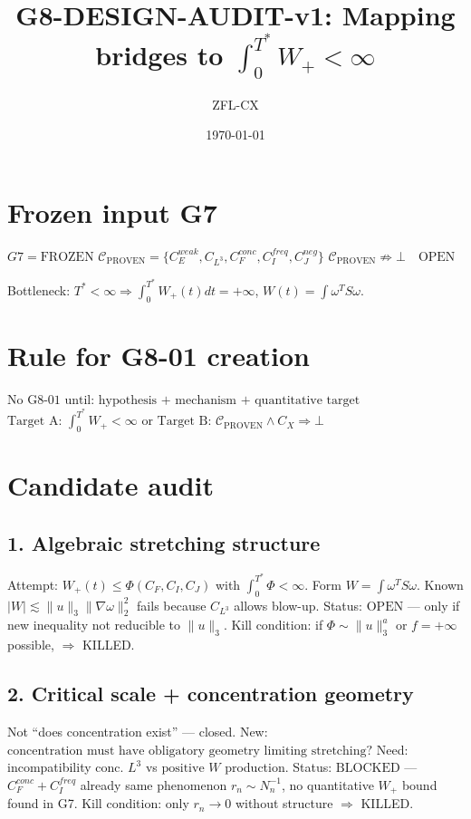 \documentclass[11pt]{article}
\begin{document}
\title{G8-DESIGN-AUDIT-v1: Mapping bridges to $\int_0^{T^*}W_+<\infty$}
\author{ZFL-CX}\date{\today}\maketitle

\section{Frozen input G7}
\begin{center}
$\boxed{G7=\mathrm{FROZEN}}$
$\boxed{\mathcal C_{\mathrm{PROVEN}}=\{C_E^{weak},C_{L^3},C_F^{conc},C_I^{freq},C_J^{neg}\}}$
$\boxed{\mathcal C_{\mathrm{PROVEN}}\not\Rightarrow\bot\quad\text{OPEN}}$
\end{center}
Bottleneck: $\boxed{T^*<\infty\Rightarrow\int_0^{T^*}W_+(t)dt=+\infty}$, $W(t)=\int\omega^TS\omega$.

\section{Rule for G8-01 creation}
\begin{center}
$\boxed{\text{No G8-01 until: hypothesis + mechanism + quantitative target}}$\\
$\boxed{\text{Target A: }\int_0^{T^*}W_+<\infty\text{ or Target B: }\mathcal C_{\mathrm{PROVEN}}\land C_X\Rightarrow\bot}$
\end{center}

\section{Candidate audit}

\subsection{1. Algebraic stretching structure}
Attempt: $\boxed{W_+(t)\le\Phi(C_F,C_I,C_J)}$ with $\int_0^{T^*}\Phi<\infty$.
Form $W=\int\omega^TS\omega$. Known $ |W|\lesssim\|u\|_3\|\nabla\omega\|_2^2$ fails because $C_{L^3}$ allows blow-up.
Status: $\boxed{\mathrm{OPEN}}$ — only if new inequality not reducible to $\|u\|_3$.
Kill condition: if $\Phi\sim\|u\|_3^a$ or $f=+\infty$ possible, $\Rightarrow$ KILLED.

\subsection{2. Critical scale + concentration geometry}
Not ``does concentration exist'' — closed. New: $\boxed{\text{concentration must have obligatory geometry limiting stretching?}}$
Need: incompatibility $\text{conc. }L^3$ vs $\text{positive }W$ production.
Status: $\boxed{\mathrm{BLOCKED}}$ — $C_F^{conc}+C_I^{freq}$ already same phenomenon $r_n\sim N_n^{-1}$, no quantitative $W_+$ bound found in G7.
Kill condition: only $r_n\to0$ without structure $\Rightarrow$ KILLED.
\end{document}
